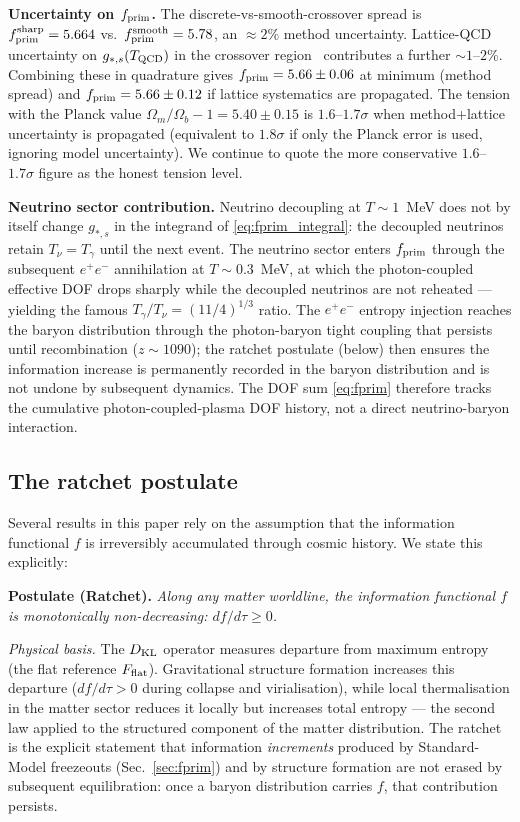 \documentclass[aps,prd,twocolumn,nofootinbib,floatfix,superscriptaddress]{revtex4-2}
\newcommand{\fprim}{f_{\rm prim}}
\begin{document}
\textbf{Uncertainty on $\fprim$.}
The discrete-vs-smooth-crossover spread is $\fprim^{\rm sharp} = 5.664$
vs.\ $\fprim^{\rm smooth} = 5.78$, an $\approx 2\%$ method
uncertainty. Lattice-QCD uncertainty on $g_{*,s}(T_{\rm QCD})$ in
the crossover region~\cite{BorsanyiQCD2016} contributes a further
$\sim 1$--$2\%$. Combining these in quadrature gives
$\fprim = 5.66 \pm 0.06$ at minimum (method spread) and
$\fprim = 5.66 \pm 0.12$ if lattice systematics are propagated. The
tension with the Planck value $\Omega_m/\Omega_b - 1 = 5.40\pm 0.15$
is $1.6$--$1.7\sigma$ when method+lattice uncertainty is propagated
(equivalent to $1.8\sigma$ if only the Planck error is used,
ignoring model uncertainty). We continue to quote the more
conservative $1.6$--$1.7\sigma$ figure as the honest tension level.

\textbf{Neutrino sector contribution.} Neutrino decoupling at
$T \sim 1$~MeV does not by itself change $g_{*,s}$ in the integrand
of \eqref{eq:fprim_integral}: the decoupled neutrinos retain
$T_\nu = T_\gamma$ until the next event. The neutrino sector enters
$\fprim$ through the subsequent $e^+e^-$ annihilation at
$T \sim 0.3$~MeV, at which the photon-coupled effective DOF drops
sharply while the decoupled neutrinos are not reheated --- yielding
the famous $T_\gamma/T_\nu = (11/4)^{1/3}$ ratio. The $e^+e^-$
entropy injection reaches the baryon distribution through the
photon-baryon tight coupling that persists until recombination
($z\sim 1090$); the ratchet postulate (below) then ensures the
information increase is permanently recorded in the baryon
distribution and is not undone by subsequent dynamics. The DOF sum
\eqref{eq:fprim} therefore tracks the cumulative photon-coupled-plasma
DOF history, not a direct neutrino-baryon interaction.

\subsection{The ratchet postulate}
\label{sec:ratchet}

Several results in this paper rely on the assumption that the
information functional $f$ is irreversibly accumulated through cosmic
history. We state this explicitly:

\textbf{Postulate (Ratchet).} \emph{Along any matter worldline,
the information functional $f$ is monotonically non-decreasing:
$df/d\tau \geq 0$.}

\emph{Physical basis.} The $D_{\rm KL}$ operator measures departure
from maximum entropy (the flat reference $F_{\rm flat}$).
Gravitational structure formation increases this departure
($df/d\tau > 0$ during collapse and virialisation), while local
thermalisation in the matter sector reduces it locally but increases
total entropy --- the second law applied to the structured
component of the matter distribution. The ratchet is the explicit
statement that information \emph{increments} produced by
Standard-Model freezeouts (Sec.~\ref{sec:fprim}) and by structure
formation are not erased by subsequent equilibration: once a baryon
distribution carries $f$, that contribution persists.
\end{document}
